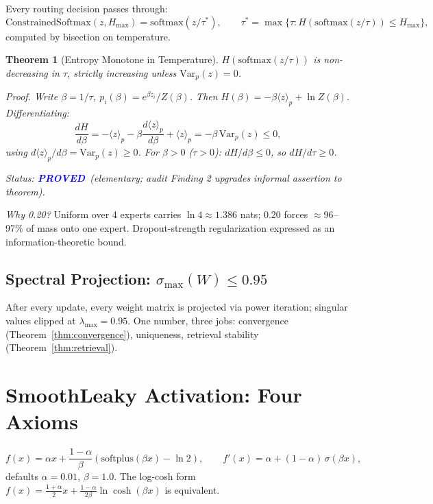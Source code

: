 \documentclass[11pt,letterpaper]{article}
\newtheorem{theorem}{Theorem}[section]
\newcommand{\PROVED}{\textbf{\textcolor{blue}{PROVED}}}
\begin{document}
Every routing decision passes through:
\[
\mathrm{ConstrainedSoftmax}(z, H_{\max}) = \mathrm{softmax}(z/\tau^*),
\qquad
\tau^* = \max\{\tau : H(\mathrm{softmax}(z/\tau)) \leq H_{\max}\},
\]
computed by bisection on temperature.

\begin{theorem}[Entropy Monotone in Temperature]
\label{thm:entropy-mono}
$H(\mathrm{softmax}(z/\tau))$ is non-decreasing in $\tau$, strictly increasing
unless $\mathrm{Var}_p(z) = 0$.

\textit{Proof.} Write $\beta = 1/\tau$, $p_i(\beta) = e^{\beta z_i}/Z(\beta)$.
Then $H(\beta) = -\beta\langle z\rangle_p + \ln Z(\beta)$.  Differentiating:
\[
\frac{dH}{d\beta} = -\langle z\rangle_p - \beta\frac{d\langle z\rangle_p}{d\beta}
+ \langle z\rangle_p = -\beta\,\mathrm{Var}_p(z) \leq 0,
\]
using $d\langle z\rangle_p/d\beta = \mathrm{Var}_p(z) \geq 0$.
For $\beta > 0$ ($\tau > 0$): $dH/d\beta \leq 0$, so $dH/d\tau \geq 0$.

Status: \PROVED\ (elementary; audit Finding 2 upgrades informal assertion to theorem).
\end{theorem}

\textit{Why 0.20?} Uniform over 4 experts carries $\ln 4 \approx 1.386$ nats;
0.20 forces $\approx 96$--97\% of mass onto one expert.  Dropout-strength
regularization expressed as an information-theoretic bound.

\subsection{Spectral Projection: $\sigma_{\max}(W) \leq 0.95$}

After every update, every weight matrix is projected via power iteration;
singular values clipped at $\lambda_{\max} = 0.95$.  One number, three jobs:
convergence (Theorem~\ref{thm:convergence}), uniqueness, retrieval stability
(Theorem~\ref{thm:retrieval}).

\section{SmoothLeaky Activation: Four Axioms}
\label{sec:activation}

\[
f(x) = \alpha x + \frac{1-\alpha}{\beta}\!\left(\mathrm{softplus}(\beta x) - \ln 2\right),
\qquad
f'(x) = \alpha + (1-\alpha)\,\sigma(\beta x),
\]
defaults $\alpha = 0.01$, $\beta = 1.0$.  The log-cosh form
$f(x) = \tfrac{1+\alpha}{2}x + \tfrac{1-\alpha}{2\beta}\ln\cosh(\beta x)$ is equivalent.
\end{document}
